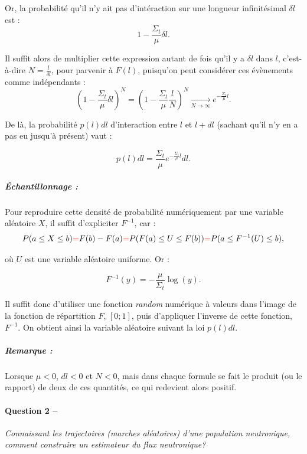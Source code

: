 \message{ !name(rapport_monte_carlo.tex)}\documentclass[12pt,a4paper]{article}
\newcommand{\question}[2]{\paragraph{Question #1 --}\hspace{-7pt}\textit{#2} \\}
\begin{document}
Or, la probabilité qu'il n'y ait pas d'intéraction sur une longueur infinitésimal $\delta l$ est :
\begin{equation}
  1- \frac{\Sigma_t}{\mu} \delta l .
\end{equation}

Il suffit alors de multiplier cette expression autant de fois qu'il y a $\delta l$ dans $l$, c'est-à-dire $N=\frac{l}{\delta l}$, pour parvenir à $F(l)$, puisqu'on peut considérer ces évènements comme indépendants : 
\begin{equation}
  \left(1-\frac{\Sigma_t}{\mu} \delta l\right)^N = \left(1-\frac{\Sigma_t}{\mu} \frac{l}{N}\right)^N  \xrightarrow[N \rightarrow \infty]{} e^{-\frac{\Sigma_t}{\mu} l} .
\end{equation}

De là, la probabilité $p(l) dl$ d'interaction entre $l$ et $l+dl$ (sachant qu'il n'y en a pas eu jusqu'à présent) vaut :

\begin{equation}
  p(l) dl = \frac{\Sigma_t}{\mu} e^{-\frac{\Sigma_t}{\mu} l} dl .
\end{equation}

\subparagraph{Échantillonnage :}

Pour reproduire cette densité de probabilité numériquement par une variable aléatoire $X$, il suffit d'expliciter $F^{-1}$, car :
\begin{equation}
  P(a\leq X\leq b) {\color{red}=} F(b) - F(a) {\color{red}=} P(F(a)\leq U\leq F(b)) {\color{red}=} P(a\leq F^{-1}(U)\leq b) ,
\end{equation}

où $U$ est une variable aléatoire uniforme. Or :

\begin{equation}
  F^{-1}(y) = -\frac{\mu}{\Sigma_t} \log(y) .
\end{equation}

Il suffit donc d'utiliser une fonction \textit{random} numérique à valeurs dans l'image de la fonction de répartition $F$, $[0;1]$, puis d'appliquer l'inverse de cette fonction, $F^{-1}$.
On obtient ainsi la variable aléatoire suivant la loi $p(l) dl$.

\subparagraph{Remarque :} Lorsque $\mu<0$, $dl<0$ et $N<0$, mais dans chaque formule se fait le produit (ou le rapport) de deux de ces quantités, ce qui redevient alors positif.

\question{2}{Connaissant les trajectoires (marches aléatoires) d'une population neutronique, comment construire un estimateur du flux neutronique?}
\end{document}
